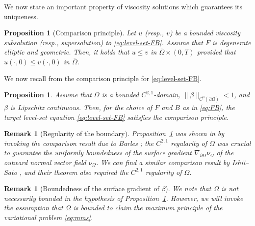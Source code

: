 \documentclass[11pt]{article}
\numberwithin{equation}{section}
\newtheorem{proposition}[theorem]{Proposition}
\newtheorem{remark}[theorem]{Remark}
\newtheorem*{proposition*}{Proposition}
\newcommand{\pOmega}[0]{\partial\Omega}
\newcommand{\sgrad}[0]{\nabla_{\pOmega}}
\def\le{\leqslant}
\begin{document}
We now state an important property of viscosity solutions which guarantees its uniqueness.

\noindent
\begin{proposition*}[Comparison principle]
    \label{prop:comparison-principle}
Let $u$ (resp., $v$) be a bounded viscosity subsolution (resp., supersolution) to \eqref{eq:level-set-FB}.
Assume that $F$ is degenerate elliptic and geometric.
Then, it holds that $u \le v$ in $\overline{\Omega}\times(0,T)$ provided that $u(\cdot,0)\le v(\cdot,0)$ in $\overline{\Omega}$. 
\end{proposition*}

We now recall from \cite[Theorem 2.2]{EG25} the comparison principle for \eqref{eq:level-set-FB}.
\begin{proposition}\label{prop:comparison-principle}
    Assume that $\Omega$ is a bounded $C^{2,1}$-domain, $\|\beta\|_{C^0(\pOmega)} < 1$, and $\beta$ is Lipschitz continuous.
    Then, for the choice of $F$ and $B$ as in \eqref{eq:FB}, the target level-set equation \eqref{eq:level-set-FB} satisfies the comparison principle.
\end{proposition}

\begin{remark}[Regularity of the boundary]
    Proposition~\ref{prop:comparison-principle} was shown in \cite[Theorem 2.1]{EG25} by invoking the comparison result due to Barles \cite[Theorem 3.1]{B99};
    the $C^{2,1}$ regularity of $\Omega$ was crucial to guarantee the uniformly boundedness of the surface gradient $\sgrad\nu_\Omega$ of the outward normal vector field $\nu_\Omega$.
    We can find a similar comparison result by Ishii--Sato \cite[Theorem 2.1,\S 5]{IS04}, and their theorem also required the $C^{2,1}$ regularity of $\Omega$.
\end{remark}

\begin{remark}[Boundedness of the surface gradient of $\beta$]
    We note that $\Omega$ is not necessarily bounded in the hypothesis of Proposition~\ref{prop:comparison-principle}.
    However, we will invoke the assumption that $\Omega$ is bounded to claim the maximum principle of the variational problem \eqref{eq:mms}.%
\end{remark}
\end{document}
